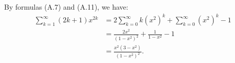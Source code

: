 \exercise
By formulas (A.7) and (A.11), we have:
\begin{align*}
    \sum_{k=1}^\infty(2k+1)x^{2k} &= 2\sum_{k=0}^\infty k(x^2)^k + \sum_{k=0}^\infty(x^2)^k-1 \\
    &= \frac{2x^2}{(1-x^2)^2} + \frac{1}{1-x^2}-1 \\
    &= \frac{x^2(3-x^2)}{(1-x^2)^2}.
\end{align*}

